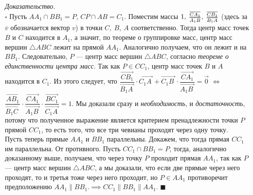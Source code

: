 \documentclass[14pt]{extarticle}
\let\Overrightarrow\overrightarrow
\theoremstyle{definition}
\theoremstyle{theorem}
\renewenvironment{proof}
    {\noindent \textit{Доказательство.}\\
	\indent $\square$}
	{ $\blacksquare$\\ }
\begin{document}
\begin{proof}
    Пусть $AA_1 \cap BB_1 = P$, $CP \cap AB = C_1$. 
	Поместим массы $1, \: \frac{\overline{CA_1}}{\vphantom
	{\overline{AB'}}\overline{A_1B}}, 
	\: \frac{\overline{CB_1}}{\vphantom
	{\overline{AB'}}\overline{B_1A}}$ (здесь за $\overline{v}$
	обозначается вектор $v$)
	в точки $C, \: B, \: A$ соответственно. Тогда центр масс точек
	$B$ и $C$ находится в $A_1$, а значит, по теореме о группировке
	масс, центр масс вершин $\triangle ABC$ лежит на прямой $AA_1$.
	Аналогично получаем, что он лежит и на $BB_1$. Следовательно,
	$P$ --- центр масс вершин $\triangle ABC$, согласно 
	\textit{теореме о единственности центра масс}. 
	Так как $P \in CC_1$, центр масс точек $B$ и $A$ находится в $C_1$.
	Из этого следует, что $\dfrac{\Overrightarrow{CB_1}}
	{\Overrightarrow{B_1A_{\,}}} \cdot \Overrightarrow{C_1A_{\,}} +
	\Overrightarrow{C_1B_{\:}} \cdot
	\dfrac{\Overrightarrow{CA_1}}{\Overrightarrow{A_1B_{\:}}} = \vec{0}$
    $\iff$ 
	$
	\dfrac{\Overrightarrow{AB_1}}{\Overrightarrow{B_1C_{\, \,}}} \cdot 
	\dfrac{\Overrightarrow{CA_1}}
	{\Overrightarrow{A_1B_{\:}}} \cdot \dfrac{\Overrightarrow{BC_1}}
	{\Overrightarrow{C_1A_{\,}}} = 1$.
	Мы доказали сразу и \textit{необходимость}, и \textit{достаточность},
	потому что полученное выражение является критерием пренадлежности точки
	$P$ прямой $CC_1$, то есть
	того, что все три чевианы проходят через одну точку.\\
    
	Пусть теперь  прямые $AA_1$ и $BB_1$ параллельны. Докажем, что 
	тогда прямая $CC_1$ им параллельна. От противного. Пусть
	$CC_1 \cap BB_1 = P$, тогда, аналогично доказанному выше, получаем, что
	через точку $P$ проходит прямая $AA_1$, так как $P$ --- центр масс
	вершин $\triangle ABC$, а мы доказали, что если две прямые
	через него проходят, то и третья тоже через него проходит,
	но $P \in AA_1$  противоречит предположению
	$AA_1 \parallel BB_1. \implies CC_1 \parallel BB_1 \parallel AA_1$.
\end{proof}
\end{document}
